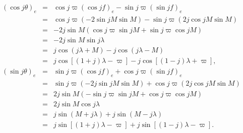 \documentclass [12pt, a4paper] {article}
\begin{document}
\begin {eqnarray}
    (\cos j\theta)_e 
    &=&
    \cos j\varpi(\cos jf)_e - \sin j\varpi(\sin jf)_e
    \\
    &=&
    \cos j\varpi\left(-2\sin jM\sin M\right)
    -
    \sin j\varpi\left(2j\cos jM\sin M\right)
    \\
    &=& 
    -2j\sin M
    \left(
        \cos j\varpi\sin jM + \sin j\varpi\cos jM
    \right)
    \\
    &=& 
    -2j\sin M\sin j\lambda
    \\
    &=& 
    j\cos(j\lambda +M) - j\cos(j\lambda - M)
    \\
    &=&
    j\cos[(1+j)\lambda - \varpi] - j\cos[(1-j)\lambda + \varpi],
    \\
    (\sin j\theta)_e 
    &=&
    \sin j\varpi(\cos jf)_e + \cos j\varpi(\sin jf)_e
    \\
    &=& \sin j\varpi(-2j\sin jM\sin M) + \cos j\varpi(2j\cos jM\sin M)
    \\
    &=& 
    2j\sin M (-\sin j\varpi\sin jM + \cos j\varpi\cos jM)
    \\
    &=& 
    2j\sin M\cos j\lambda
    \\
    &=& 
    j\sin(M + j\lambda) + j\sin(M - j\lambda)
    \\
    &=& 
    j\sin[(1 + j)\lambda - \varpi] + j\sin[(1 - j)\lambda - \varpi].
\end {eqnarray}
\end{document}
